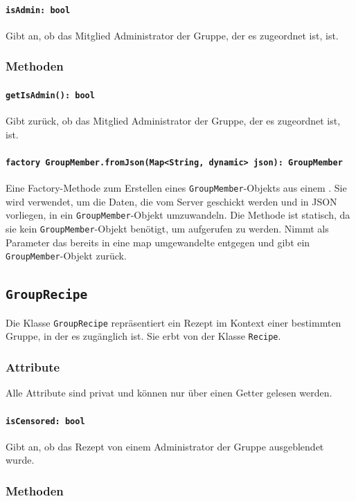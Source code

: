 \documentclass{entwurfsheft}
\begin{document}
\begin{sloppypar}
\paragraph{\texttt{isAdmin: bool}}
Gibt an, ob das Mitglied Administrator der Gruppe, der es zugeordnet ist, ist.
\subsubsection*{Methoden}
\paragraph{\texttt{getIsAdmin(): bool}}
Gibt zurück, ob das Mitglied Administrator der Gruppe, der es zugeordnet ist, ist.
\paragraph{\texttt{factory GroupMember.fromJson(Map<String, dynamic> json): GroupMember}} Eine Factory-Methode zum Erstellen eines \texttt{GroupMember}-Objekts aus einem . Sie wird verwendet, um die Daten, die vom Server geschickt werden und in \Gls{JSON} vorliegen, in ein \texttt{GroupMember}-Objekt umzuwandeln. Die Methode ist statisch, da sie kein \texttt{GroupMember}-Objekt benötigt, um aufgerufen zu werden. Nimmt als Parameter das bereits in eine \Gls{map} umgewandelte  entgegen und gibt ein \texttt{GroupMember}-Objekt zurück.
\newpage
\subsection{\texttt{GroupRecipe}}
\label{sec:groupRecipe}
Die Klasse \texttt{GroupRecipe} repräsentiert ein Rezept im Kontext einer bestimmten Gruppe, in der es zugänglich ist. Sie erbt von der Klasse \texttt{Recipe}.
\subsubsection*{Attribute}
Alle Attribute sind privat und können nur über einen Getter gelesen werden.
\paragraph{\texttt{isCensored: bool}}
Gibt an, ob das Rezept von einem Administrator der Gruppe ausgeblendet wurde.
\subsubsection*{Methoden}

\end{sloppypar}
\end{document}

